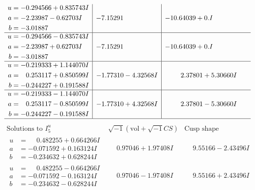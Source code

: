\documentclass[1p]{elsarticle_modified}
\theoremstyle{definition}
\newcommand{\I}{\sqrt{-1}}
\begin{document}
$$\begin{array}{c|c|c}
\begin{aligned}
u &= -0.294566 + 0.835743 I \\
a &= -2.23987 - 0.62703 I \\
b &= -3.01887\phantom{ +0.000000I}\end{aligned}
 & -7.15291\phantom{ +0.000000I} & -10.64039 + 0. I\phantom{ +0.000000I} \\ \hline\begin{aligned}
u &= -0.294566 - 0.835743 I \\
a &= -2.23987 + 0.62703 I \\
b &= -3.01887\phantom{ +0.000000I}\end{aligned}
 & -7.15291\phantom{ +0.000000I} & -10.64039 + 0. I\phantom{ +0.000000I} \\ \hline\begin{aligned}
u &= -0.219333 + 1.144070 I \\
a &= \phantom{-}0.253117 + 0.850599 I \\
b &= -0.244227 + 0.191588 I\end{aligned}
 & -1.77310 - 4.32568 I & \phantom{-}2.37801 + 5.30660 I \\ \hline\begin{aligned}
u &= -0.219333 - 1.144070 I \\
a &= \phantom{-}0.253117 - 0.850599 I \\
b &= -0.244227 - 0.191588 I\end{aligned}
 & -1.77310 + 4.32568 I & \phantom{-}2.37801 - 5.30660 I\\
 \hline 
 \end{array}$$\newpage$$\begin{array}{c|c|c}  
\text{Solutions to }I^u_{5}& \I (\text{vol} + \sqrt{-1}CS) & \text{Cusp shape}\\
 \hline 
\begin{aligned}
u &= \phantom{-}0.482255 + 0.664266 I \\
a &= -0.071592 + 0.163124 I \\
b &= -0.234632 + 0.628244 I\end{aligned}
 & \phantom{-}0.97046 + 1.97408 I & \phantom{-}9.55166 - 2.43496 I \\ \hline\begin{aligned}
u &= \phantom{-}0.482255 - 0.664266 I \\
a &= -0.071592 - 0.163124 I \\
b &= -0.234632 - 0.628244 I\end{aligned}
 & \phantom{-}0.97046 - 1.97408 I & \phantom{-}9.55166 + 2.43496 I \\ \hline\begin{aligned}

\end{aligned}
\end{array}$$
\end{document}
